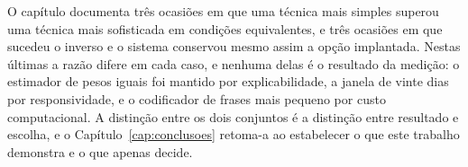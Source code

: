 O capítulo documenta três ocasiões em que uma técnica mais simples superou uma técnica mais
sofisticada em condições equivalentes, e três ocasiões em que sucedeu o inverso e o sistema
conservou mesmo assim a opção implantada. Nestas últimas a razão difere em cada caso, e nenhuma
delas é o resultado da medição: o estimador de pesos iguais foi mantido por explicabilidade, a
janela de vinte dias por responsividade, e o codificador de frases mais pequeno por custo
computacional. A distinção entre os dois conjuntos é a distinção entre resultado e escolha, e o
Capítulo~\ref{cap:conclusoes} retoma-a ao estabelecer o que este trabalho demonstra e o
que apenas decide.
